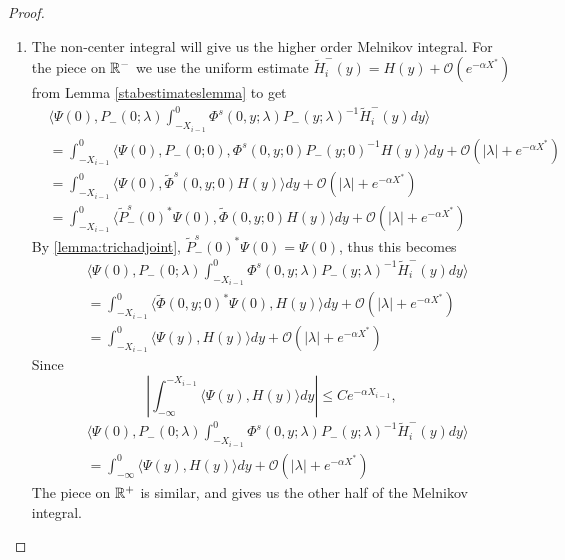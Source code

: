 \documentclass[thesis.tex]{subfiles}
\begin{document}
\begin{lemma}
\begin{proof}
\begin{enumerate}
\item The non-center integral will give us the higher order Melnikov integral. For the piece on $\mathbb{R}^-$ we use the uniform estimate $\tilde{H}_i^-(y) = H(y) + \mathcal{O}(e^{-\alpha X^*})$ from Lemma \ref{stabestimateslemma} to get
\begin{align*}
&\langle \Psi(0), P_-(0; \lambda) \int_{-X_{i-1}}^0 \Phi^s(0, y; \lambda) P_-(y; \lambda)^{-1} \tilde{H}_i^-(y) dy \rangle \\
&= \int_{-X_{i-1}}^0 \langle \Psi(0), P_-(0; 0), \Phi^s(0, y; 0) P_-(y; 0)^{-1} H(y) \rangle dy + \mathcal{O}(|\lambda| + {e^{-\alpha X^*}}) \\
&= \int_{-X_{i-1}}^0 \langle \Psi(0), \tilde{\Phi}^s(0, y; 0) H(y) \rangle dy + \mathcal{O}(|\lambda| + {e^{-\alpha X^*}}) \\
&= \int_{-X_{i-1}}^0 \langle \tilde{P}_-^s(0)^*\Psi(0), \tilde{\Phi}(0, y; 0) H(y) \rangle dy + \mathcal{O}(|\lambda| + {e^{-\alpha X^*}})
\end{align*}
By \cref{lemma:trichadjoint}, $\tilde{P}_-^s(0)^*\Psi(0) = \Psi(0)$, thus this becomes
\begin{align*}
&\langle \Psi(0), P_-(0; \lambda) \int_{-X_{i-1}}^0 \Phi^s(0, y; \lambda) P_-(y; \lambda)^{-1} \tilde{H}_i^-(y) dy \rangle \\
&= \int_{-X_{i-1}}^0 \langle \tilde{\Phi}(0, y; 0) ^* \Psi(0), H(y) \rangle dy + \mathcal{O}(|\lambda| + {e^{-\alpha X^*}}) \\
&= \int_{-X_{i-1}}^0 \langle \Psi(y), H(y) \rangle dy + \mathcal{O}(|\lambda| + {e^{-\alpha X^*}})
\end{align*}
Since 
\[
\left| \int_{-\infty}^{-X_{i-1}} \langle \Psi(y), H(y) \rangle dy \right| \leq C e^{-\alpha X_{i-1}},
\]
\begin{align*}
&\langle \Psi(0), P_-(0; \lambda) \int_{-X_{i-1}}^0 \Phi^s(0, y; \lambda) P_-(y; \lambda)^{-1} \tilde{H}_i^-(y) dy \rangle \\
&= \int_{-\infty}^0 \langle \Psi(y), H(y) \rangle dy + \mathcal{O}(|\lambda| + {e^{-\alpha X^*}})
\end{align*}
The piece on $\mathbb{R}^+$ is similar, and gives us the other half of the Melnikov integral.


\end{enumerate}
\end{proof}
\end{lemma}
\end{document}
